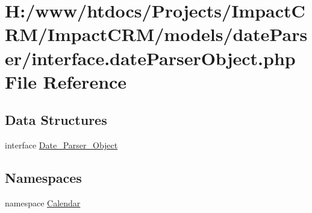 \hypertarget{interface_8dateParserObject_8php}{
\section{H:/www/htdocs/Projects/ImpactCRM/ImpactCRM/models/dateParser/interface.dateParserObject.php File Reference}
\label{interface_8dateParserObject_8php}
}
\subsection*{Data Structures}
\begin{DoxyCompactItemize}
\item 
interface \hyperlink{interfaceDate__Parser__Object}{Date\_\-Parser\_\-Object}
\end{DoxyCompactItemize}
\subsection*{Namespaces}
\begin{DoxyCompactItemize}
\item 
namespace \hyperlink{namespaceCalendar}{Calendar}
\end{DoxyCompactItemize}
